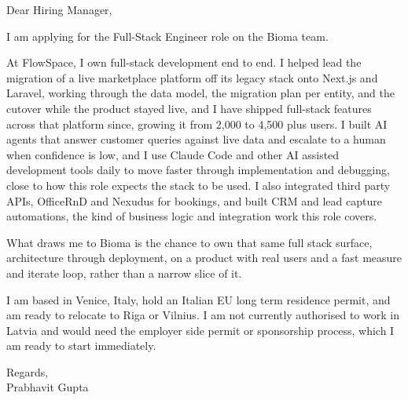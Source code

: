 \documentclass[a4paper,11pt]{article}
\begin{document}
Dear Hiring Manager,

I am applying for the Full-Stack Engineer role on the Bioma team.

At FlowSpace, I own full-stack development end to end. I helped lead the migration of a live marketplace platform off its legacy stack onto Next.js and Laravel, working through the data model, the migration plan per entity, and the cutover while the product stayed live, and I have shipped full-stack features across that platform since, growing it from 2,000 to 4,500 plus users. I built AI agents that answer customer queries against live data and escalate to a human when confidence is low, and I use Claude Code and other AI assisted development tools daily to move faster through implementation and debugging, close to how this role expects the stack to be used. I also integrated third party APIs, OfficeRnD and Nexudus for bookings, and built CRM and lead capture automations, the kind of business logic and integration work this role covers.

What draws me to Bioma is the chance to own that same full stack surface, architecture through deployment, on a product with real users and a fast measure and iterate loop, rather than a narrow slice of it.

I am based in Venice, Italy, hold an Italian EU long term residence permit, and am ready to relocate to Riga or Vilnius. I am not currently authorised to work in Latvia and would need the employer side permit or sponsorship process, which I am ready to start immediately.

Regards,\\
Prabhavit Gupta
\end{document}
